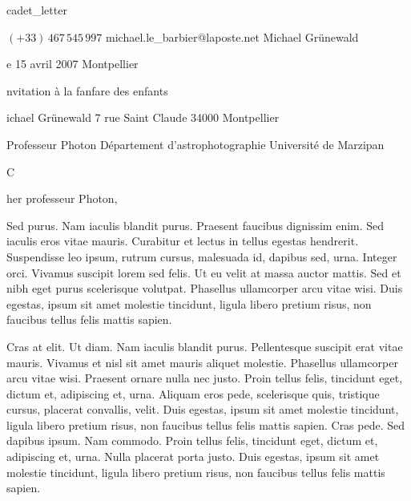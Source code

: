 


\class cadet_letter

%
%



\phone          $(+33)\,467\,545\,997$
\email          michael.le\_barbier@laposte.net
\name           Michael Grünewald
\date           le 15 avril 2007
\place          Montpellier
\subject        Invitation à la fanfare des enfants


\address
Michael Grünewald
7 rue Saint Claude
34000 Montpellier

\addressee
Professeur Photon
Département d'astrophotographie
Université de Marzipan

%
%


\opening        Cher professeur Photon,

Sed purus. Nam iaculis blandit purus. Praesent faucibus dignissim
enim. Sed iaculis eros vitae mauris. Curabitur et lectus in tellus
egestas hendrerit. Suspendisse leo ipsum, rutrum cursus, malesuada id,
dapibus sed, urna. Integer orci. Vivamus suscipit lorem sed felis. Ut
eu velit at massa auctor mattis. Sed et nibh eget purus scelerisque
volutpat. Phasellus ullamcorper arcu vitae wisi. Duis egestas, ipsum
sit amet molestie tincidunt, ligula libero pretium risus, non faucibus
tellus felis mattis sapien.

Cras at elit. Ut diam. Nam iaculis blandit purus. Pellentesque
suscipit erat vitae mauris. Vivamus et nisl sit amet mauris aliquet
molestie. Phasellus ullamcorper arcu vitae wisi. Praesent ornare nulla
nec justo. Proin tellus felis, tincidunt eget, dictum et, adipiscing
et, urna. Aliquam eros pede, scelerisque quis, tristique cursus,
placerat convallis, velit. Duis egestas, ipsum sit amet molestie
tincidunt, ligula libero pretium risus, non faucibus tellus felis
mattis sapien. Cras pede. Sed dapibus ipsum. Nam commodo. Proin tellus
felis, tincidunt eget, dictum et, adipiscing et, urna. Nulla placerat
porta justo. Duis egestas, ipsum sit amet molestie tincidunt, ligula
libero pretium risus, non faucibus tellus felis mattis sapien.


